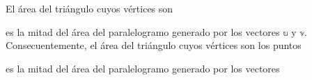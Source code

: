 El área del triángulo cuyos vértices son
\begin{matrizn}
\end{matrizn}
es la mitad del área del paralelogramo generado por los vectores $\mathbb{u}$ y $\mathbb{v}$. Consecuentemente, el área del triángulo cuyos vértices son los puntos
\begin{matrizn}
\end{matrizn}
es la mitad del área del paralelogramo generado por los vectores
\begin{matrizn}
\end{matrizn}

